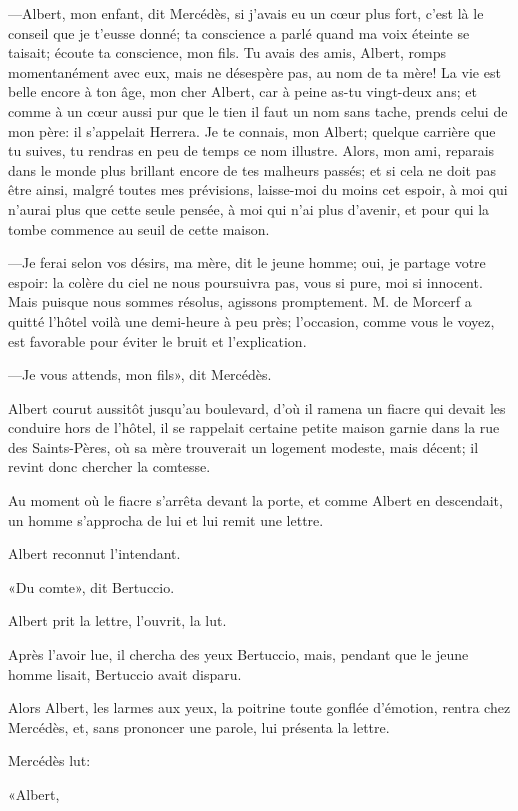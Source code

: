 —Albert, mon enfant, dit Mercédès, si j'avais eu un cœur plus fort, c'est là le conseil que je t'eusse donné; ta conscience a parlé quand ma voix éteinte se taisait; écoute ta conscience, mon fils. Tu avais des amis, Albert, romps momentanément avec eux, mais ne désespère pas, au nom de ta mère! La vie est belle encore à ton âge, mon cher Albert, car à peine as-tu vingt-deux ans; et comme à un cœur aussi pur que le tien il faut un nom sans tache, prends celui de mon père: il s'appelait Herrera. Je te connais, mon Albert; quelque carrière que tu suives, tu rendras en peu de temps ce nom illustre. Alors, mon ami, reparais dans le monde plus brillant encore de tes malheurs passés; et si cela ne doit pas être ainsi, malgré toutes mes prévisions, laisse-moi du moins cet espoir, à moi qui n'aurai plus que cette seule pensée, à moi qui n'ai plus d'avenir, et pour qui la tombe commence au seuil de cette maison. 

—Je ferai selon vos désirs, ma mère, dit le jeune homme; oui, je partage votre espoir: la colère du ciel ne nous poursuivra pas, vous si pure, moi si innocent. Mais puisque nous sommes résolus, agissons promptement. M. de Morcerf a quitté l'hôtel voilà une demi-heure à peu près; l'occasion, comme vous le voyez, est favorable pour éviter le bruit et l'explication. 

—Je vous attends, mon fils», dit Mercédès. 

Albert courut aussitôt jusqu'au boulevard, d'où il ramena un fiacre qui devait les conduire hors de l'hôtel, il se rappelait certaine petite maison garnie dans la rue des Saints-Pères, où sa mère trouverait un logement modeste, mais décent; il revint donc chercher la comtesse. 

Au moment où le fiacre s'arrêta devant la porte, et comme Albert en descendait, un homme s'approcha de lui et lui remit une lettre. 

Albert reconnut l'intendant. 

«Du comte», dit Bertuccio. 

Albert prit la lettre, l'ouvrit, la lut. 

Après l'avoir lue, il chercha des yeux Bertuccio, mais, pendant que le jeune homme lisait, Bertuccio avait disparu. 

Alors Albert, les larmes aux yeux, la poitrine toute gonflée d'émotion, rentra chez Mercédès, et, sans prononcer une parole, lui présenta la lettre. 

Mercédès lut: 

«Albert, 

